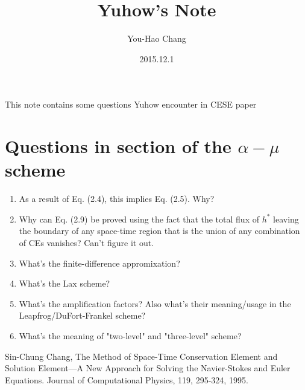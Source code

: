 \documentclass[a4paper,12pt,dvips]{article}
\begin{document}
\title{Yuhow's Note}
\author{You-Hao Chang}
\date{2015.12.1}

\maketitle

\tableofcontents

\hspace{.5cm}

This note contains some questions Yuhow encounter in CESE paper~\cite{CESE_Shin_Chung_Chang_1995}

\section{Questions in section of the $\alpha-\mu$ scheme}
 \begin{enumerate}
  \item As a result of Eq. (2.4), this implies Eq. (2.5).  Why?
  \item Why can Eq. (2.9) be proved using the fact that the total flux of $h^{*}$ leaving the boundary of any space-time region that is the union of any combination of CEs vanishes? Can't figure it out.
  \item What's the finite-difference appromixation?
  \item What's the Lax scheme?
  \item What's the amplification factors? Also what's their meaning/usage in the Leapfrog/DuFort-Frankel scheme?
  \item What's the meaning of "two-level" and "three-level" scheme?
 \end{enumerate}


\begin{thebibliography}{99}
 Sin-Chung Chang, The Method of Space-Time Conservation Element and Solution Element—A New Approach for Solving the Navier-Stokes and Euler Equations. Journal of Computational Physics, 119, 295-324, 1995.
\end{thebibliography}
\end{document}
